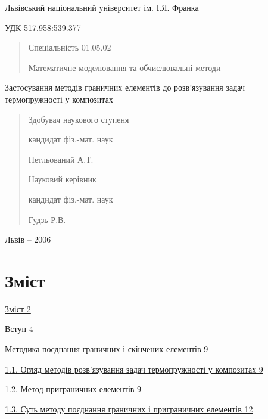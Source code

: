 Львівський національний університет ім. І.Я. Франка

УДК 517.958:539.377

\begin{quote}
Спеціальність 01.05.02

Математичне моделювання та обчислювальні методи
\end{quote}

Застосування методів граничних елементів до розв'язування задач
термопружності у композитах

\begin{quote}
Здобувач наукового ступеня

кандидат фіз.-мат. наук

Петльований А.Т.

Науковий керівник

кандидат фіз.-мат. наук

Гудзь Р.В.
\end{quote}

Львів -- 2006

\hypertarget{ux437ux43cux456ux441ux442}{%
\section{Зміст}\label{ux437ux43cux456ux441ux442}}

\protect\hyperlink{ux437ux43cux456ux441ux442}{Зміст 2}

\protect\hyperlink{ux432ux441ux442ux443ux43f}{Вступ 4}

\protect\hyperlink{ux43cux435ux442ux43eux434ux438ux43aux430-ux43fux43eux454ux434ux43dux430ux43dux43dux44f-ux433ux440ux430ux43dux438ux447ux43dux438ux445-ux456-ux441ux43aux456ux43dux447ux435ux43dux438ux445-ux435ux43bux435ux43cux435ux43dux442ux456ux432}{Методика
поєднання граничних і скінчених елементів 9}

\protect\hyperlink{ux43eux433ux43bux44fux434-ux43cux435ux442ux43eux434ux456ux432-ux440ux43eux437ux432ux44fux437ux443ux432ux430ux43dux43dux44f-ux437ux430ux434ux430ux447-ux442ux435ux440ux43cux43eux43fux440ux443ux436ux43dux43eux441ux442ux456-ux443-ux43aux43eux43cux43fux43eux437ux438ux442ux430ux445}{1.1.
Огляд методів розв'язування задач термопружності у композитах 9}

\protect\hyperlink{_Toc148277847}{1.2. Метод приграничних елементів 9}

\protect\hyperlink{ux441ux443ux442ux44c-ux43cux435ux442ux43eux434ux443-ux43fux43eux454ux434ux43dux430ux43dux43dux44f-ux433ux440ux430ux43dux438ux447ux43dux438ux445-ux456-ux43fux440ux438ux433ux440ux430ux43dux438ux447ux43dux438ux445-ux435ux43bux435ux43cux435ux43dux442ux456ux432}{1.3.
Суть методу поєднання граничних і приграничних елементів 12}

